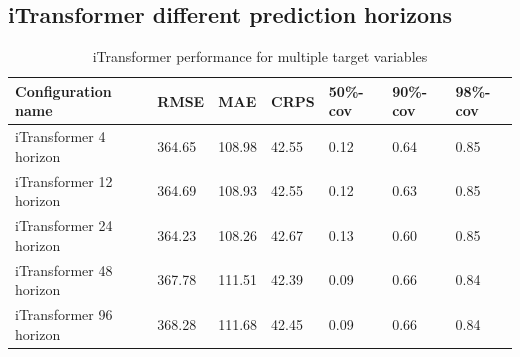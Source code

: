 \documentclass[class=scrbook, crop=false]{standalone}
\begin{document}
\subsection{iTransformer different prediction horizons}


 \begin{table}[]
\centering
\begin{tabular}{l|l|l|l|l|l|l}
 Configuration name			&  RMSE 	& MAE 	& CRPS 	& 50\%-cov & 90\%-cov & 98\%-cov \\\hline
 iTransformer 4 horizon			& 364.65	&108.98	&42.55	&0.12		& 0.64	 & 0.85 \\
 iTransformer 12 horizon			& 364.69	&108.93	&42.55	&0.12		& 0.63	 & 0.85 \\
 iTransformer 24 horizon			& 364.23	&108.26	&42.67	&0.13		& 0.60	 &0.85 \\
 iTransformer 48 horizon			& 367.78	&111.51	&42.39	&0.09		& 0.66	 & 0.84 \\
 iTransformer 96 horizon			& 368.28	&111.68	&42.45	&0.09		& 0.66	 & 0.84 \\
\end{tabular}
\caption{iTransformer performance for multiple target variables}
\label{Table::Performance_targets}
\end{table}
\end{document}
